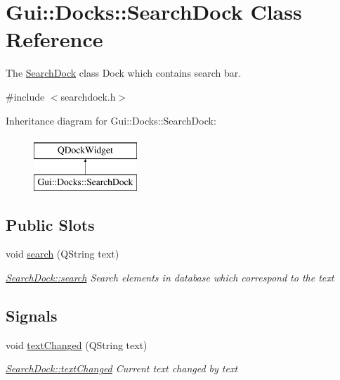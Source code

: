 \hypertarget{classGui_1_1Docks_1_1SearchDock}{\section{Gui\-:\-:Docks\-:\-:Search\-Dock Class Reference}
\label{classGui_1_1Docks_1_1SearchDock}
}


The \hyperlink{classGui_1_1Docks_1_1SearchDock}{Search\-Dock} class Dock which contains search bar.  




{\ttfamily \#include $<$searchdock.\-h$>$}

Inheritance diagram for Gui\-:\-:Docks\-:\-:Search\-Dock\-:\begin{figure}[H]
\begin{center}
\leavevmode
\includegraphics[height=2.000000cm]{de/db4/classGui_1_1Docks_1_1SearchDock}
\end{center}
\end{figure}
\subsection*{Public Slots}
\begin{DoxyCompactItemize}
\item 
void \hyperlink{classGui_1_1Docks_1_1SearchDock_a7360b52fd0bc03e089049b574e509c02}{search} (Q\-String text)
\begin{DoxyCompactList}\small\item\em \hyperlink{classGui_1_1Docks_1_1SearchDock_a7360b52fd0bc03e089049b574e509c02}{Search\-Dock\-::search} Search elements in database which correspond to the {\itshape text} \end{DoxyCompactList}\end{DoxyCompactItemize}
\subsection*{Signals}
\begin{DoxyCompactItemize}
\item 
void \hyperlink{classGui_1_1Docks_1_1SearchDock_a9b33dea8adfe26b4d7a5dadffbbb07a7}{text\-Changed} (Q\-String text)
\begin{DoxyCompactList}\small\item\em \hyperlink{classGui_1_1Docks_1_1SearchDock_a9b33dea8adfe26b4d7a5dadffbbb07a7}{Search\-Dock\-::text\-Changed} Current text changed by {\itshape text} \end{DoxyCompactList}\end{DoxyCompactItemize}
